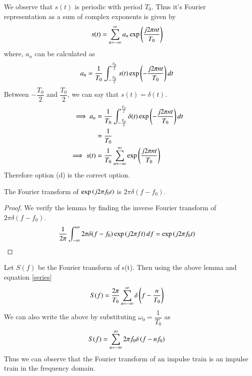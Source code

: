 \documentclass[journal,12pt,twocolumn]{IEEEtran}
\begin{document}
We observe that $s(t)$ is periodic with period $T_0$. Thus it's Fourier representation as a sum of complex exponents is given by
\begin{equation}
    s(t) = \sum_{n=-\infty}^{\infty}a_n\exp\left(\dfrac{j2\pi nt}{T_0}\right)
\end{equation}
where, $a_n$ can be calculated as
\begin{equation}
    a_n = \dfrac{1}{T_0}\int_{-\frac{T_0}{2}}^{\frac{T_0}{2}}s(t)\exp\left(-\dfrac{j2\pi nt}{T_0}\right)dt
\end{equation}
Between $-\dfrac{T_0}{2}$ and $\dfrac{T_0}{2}$, we can say that $s(t) = \delta(t)$.
\begin{align}
    \implies a_n &= \dfrac{1}{T_0}\int_{-\frac{T_0}{2}}^{\frac{T_0}{2}}\delta(t)\exp\left(-\dfrac{j2\pi nt}{T_0}\right)dt\\
        &= \dfrac{1}{T_0}\\
    \implies s(t) &= \dfrac{1}{T_0}\sum_{n=-\infty}^{\infty}\exp\left(\dfrac{j2\pi nt}{T_0}\right)\label{series}
\end{align}
Therefore option (d) is the correct option.
\begin{lemma}
The Fourier transform of $\exp \left(j2\pi f_0t\right)$ is $2\pi \delta(f-f_0)$.
\end{lemma}
\begin{proof}
We verify the lemma by finding the inverse Fourier transform of $2\pi \delta(f-f_0)$.
\begin{align}
    \dfrac{1}{2\pi}\int_{-\infty}^{\infty}2\pi \delta(f-f_0)\exp \left(j2\pi f t\right)df = \exp \left(j2\pi f_0 t\right)
\end{align}
\end{proof}
Let $S(f)$ be the Fourier transform of s(t). Then using the above lemma and equation \ref{series}
\begin{equation}
    S(f) = \dfrac{2\pi}{T_0}\sum_{n=-\infty}^{\infty}\delta\left(f-\dfrac{n}{T_0}\right)
\end{equation}
We can also write the above by substituting $\omega_0 = \dfrac{1}{T_0}$ as
\begin{equation}
    S(f) = \sum_{n=-\infty}^{\infty}2\pi f_0\delta\left(f-nf_0\right)
\end{equation}
Thus we can observe that the Fourier transform of an impulse train is an impulse train in the frequency domain.
\end{document}
